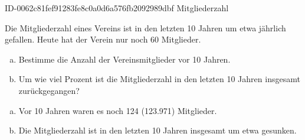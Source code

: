 \begin{exercise}
      {ID-0062c81fef91283fe8c0a0d6a576fb2092989dbf}
      {Mitgliederzahl}
  \ifproblem\problem\par
    Die Mitgliederzahl eines Vereins ist in den letzten 10
    Jahren um etwa  jährlich gefallen. Heute hat der
    Verein nur noch 60 Mitglieder.
    \begin{enumerate}[a)]
      \item Bestimme die Anzahl der Vereinsmitglieder vor 10 Jahren.
      \item Um wie viel Prozent ist die Mitgliederzahl in den letzten
            10 Jahren insgesamt zurückgegangen?
    \end{enumerate}
  \fi
  \ifoutcome\outcome\par
    \begin{enumerate}[a)]
      \item Vor 10 Jahren waren es noch \num{124} (\num{123.971})
            Mitglieder.
      \item Die Mitgliederzahl ist in den letzten 10 Jahren
            insgesamt um etwa  gesunken.
    \end{enumerate}
  \fi
\end{exercise}
